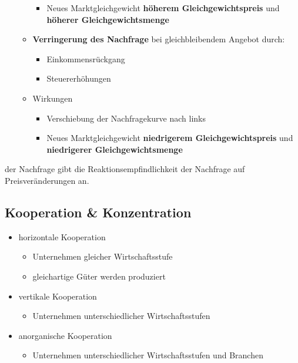 \begin{itemize}
\begin{itemize}
\begin{itemize}
			\item Neues Marktgleichgewicht {\bf höherem Gleichgewichtspreis} und {\bf höherer Gleichgewichtsmenge}
		\end{itemize}
		\item {\bf Verringerung des Nachfrage} bei gleichbleibendem Angebot durch:
		\begin{itemize}
			\item Einkommensrückgang
			\item Steuererhöhungen
		\end{itemize}
		\item Wirkungen
		\begin{itemize}
			\item Verschiebung der Nachfragekurve nach links
			\item Neues Marktgleichgewicht {\bf niedrigerem Gleichgewichtspreis} und {\bf niedrigerer Gleichgewichtsmenge}
		\end{itemize}
	\end{itemize}
\end{itemize}


 der Nachfrage gibt die Reaktionsempfindlichkeit der Nachfrage auf Preisveränderungen an.


\subsection{Kooperation \& Konzentration}

\begin{itemize}
\setlength\itemsep{0em}
	\item horizontale Kooperation
		\begin{itemize}
			\item Unternehmen gleicher Wirtschaftsstufe
			\item gleichartige Güter werden produziert
		\end{itemize}
	\item vertikale Kooperation
		\begin{itemize}
			\item Unternehmen unterschiedlicher Wirtschaftsstufen
		\end{itemize}
	\item anorganische Kooperation
		\begin{itemize}
			\item Unternehmen unterschiedlicher Wirtschaftsstufen und Branchen
		\end{itemize}
\end{itemize}

